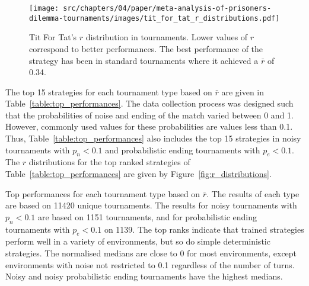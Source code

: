 \begin{figure}[!htbp]
    \centering
    \texttt{[image: src/chapters/04/paper/meta-analysis-of-prisoners-dilemma-tournaments/images/tit\_for\_tat\_r\_distributions.pdf]}
    \caption{Tit For Tat's $r$ distribution in tournaments. Lower values of \(r\)
    correspond to better performances. The best performance
    of the strategy has been in standard tournaments where it achieved a $\bar{r}$
    of 0.34.}
    \label{fig:tit_for_tat_r_distribution}
\end{figure}

The top 15 strategies for each tournament type based on \(\bar{r}\) are given in
Table~\ref{table:top_performances}. The data collection process was designed such
that the probabilities of noise and ending of the match varied between 0 and
1. However, commonly used values for these probabilities are values less than 0.1.
Thus,
Table~\ref{table:top_performances} also includes the top 15 strategies in noisy
tournaments with \(p_n < 0.1\) and probabilistic ending tournaments with \(p_e <
0.1\). The \(r\) distributions for the top ranked strategies of Table~\ref{table:top_performances}
are given by Figure~\ref{fig:r_distributions}.

\begin{table}[!htbp]
    \begin{center}
    \resizebox{\textwidth}{!}{
        
    }
\end{center}
\caption{Top performances for each tournament type based on $\bar{r}$. The
results of each type are based on 11420 unique tournaments. The
results for noisy tournaments with \(p_n < 0.1\) are based on 1151 tournaments,
and for probabilistic ending tournaments with \(p_e < 0.1\) on 1139. The top
ranks indicate that trained strategies perform well in a variety of
environments, but so do simple deterministic strategies. The normalised medians
are close to 0 for most environments, except environments with noise not
restricted to 0.1 regardless of the number of turns. Noisy and noisy probabilistic
ending tournaments have the highest medians.}
\label{table:top_performances}
\end{table}

